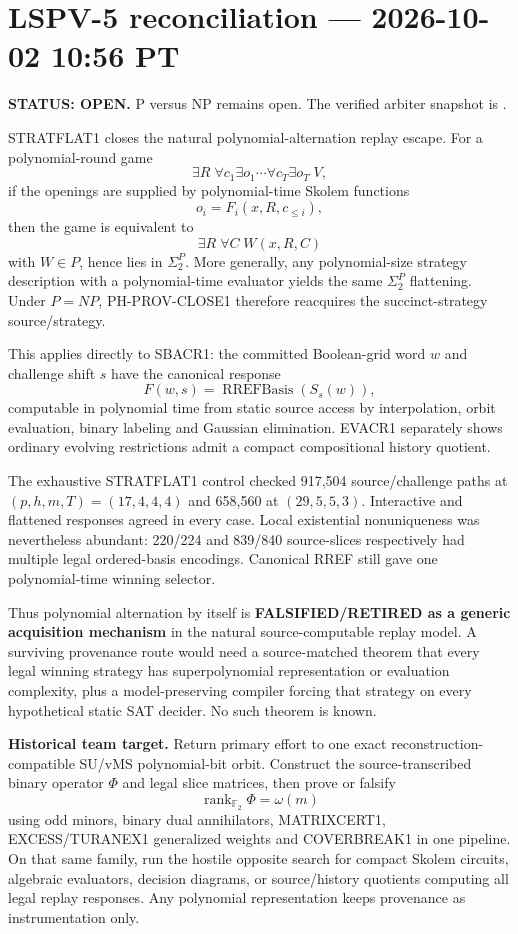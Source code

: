 \documentclass[11pt]{article}
\begin{document}
\section{LSPV-5 reconciliation --- 2026-10-02 10:56 PT}
\textbf{STATUS: OPEN.} P versus NP remains open. The verified arbiter snapshot is
.

STRATFLAT1 closes the natural polynomial-alternation replay escape. For a polynomial-round game
\[
\exists R\;\forall c_1\exists o_1\cdots\forall c_T\exists o_T\;V,
\]
if the openings are supplied by polynomial-time Skolem functions
\[
o_i=F_i(x,R,c_{\le i}),
\]
then the game is equivalent to
\[
\boxed{\exists R\;\forall C\;W(x,R,C)}
\]
with \(W\in P\), hence lies in \(\Sigma_2^P\). More generally, any polynomial-size strategy
description with a polynomial-time evaluator yields the same \(\Sigma_2^P\) flattening. Under
\(P=NP\), PH-PROV-CLOSE1 therefore reacquires the succinct-strategy source/strategy.

This applies directly to SBACR1: the committed Boolean-grid word \(w\) and challenge shift \(s\)
have the canonical response
\[
F(w,s)=\operatorname{RREFBasis}(S_s(w)),
\]
computable in polynomial time from static source access by interpolation, orbit evaluation, binary
labeling and Gaussian elimination. EVACR1 separately shows ordinary evolving restrictions admit a
compact compositional history quotient.

The exhaustive STRATFLAT1 control checked 917,504 source/challenge paths at
\((p,h,m,T)=(17,4,4,4)\) and 658,560 at \((29,5,5,3)\). Interactive and flattened responses
agreed in every case. Local existential nonuniqueness was nevertheless abundant: 220/224 and
839/840 source-slices respectively had multiple legal ordered-basis encodings. Canonical RREF still
gave one polynomial-time winning selector.

Thus polynomial alternation by itself is \textbf{FALSIFIED/RETIRED as a generic acquisition
mechanism} in the natural source-computable replay model. A surviving provenance route would need a
source-matched theorem that every legal winning strategy has superpolynomial representation or
evaluation complexity, plus a model-preserving compiler forcing that strategy on every hypothetical
static SAT decider. No such theorem is known.

\begin{candidatebox}
\textbf{Historical team target.}
Return primary effort to one exact reconstruction-compatible SU/vMS polynomial-bit orbit. Construct
the source-transcribed binary operator \(\Phi\) and legal slice matrices, then prove or falsify
\[
\operatorname{rank}_{\mathbb F_2}\Phi=\omega(m)
\]
using odd minors, binary dual annihilators, MATRIXCERT1, EXCESS/TURANEX1 generalized weights and
COVERBREAK1 in one pipeline. On that same family, run the hostile opposite search for compact
Skolem circuits, algebraic evaluators, decision diagrams, or source/history quotients computing all
legal replay responses. Any polynomial representation keeps provenance as instrumentation only.
\end{candidatebox}
\end{document}

